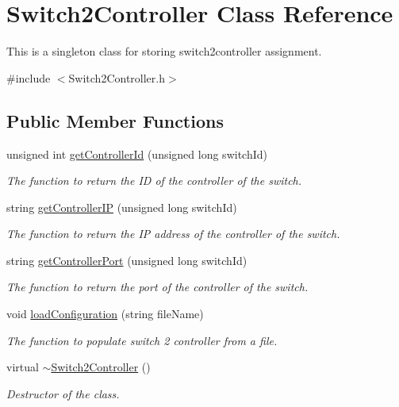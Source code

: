 \hypertarget{classSwitch2Controller}{\section{\-Switch2\-Controller \-Class \-Reference}
\label{classSwitch2Controller}
}


\-This is a singleton class for storing switch2controller assignment.  




{\ttfamily \#include $<$\-Switch2\-Controller.\-h$>$}

\subsection*{\-Public \-Member \-Functions}
\begin{DoxyCompactItemize}
\item 
unsigned int \hyperlink{classSwitch2Controller_aa7684e42768e3f4fa4ddd6f98c52057e}{get\-Controller\-Id} (unsigned long switch\-Id)
\begin{DoxyCompactList}\small\item\em \-The function to return the \-I\-D of the controller of the switch. \end{DoxyCompactList}\item 
string \hyperlink{classSwitch2Controller_a6b13d6b48d28cd1358f74742099dcf17}{get\-Controller\-I\-P} (unsigned long switch\-Id)
\begin{DoxyCompactList}\small\item\em \-The function to return the \-I\-P address of the controller of the switch. \end{DoxyCompactList}\item 
string \hyperlink{classSwitch2Controller_a90ce6d47bb11dfd94f8490952960ec90}{get\-Controller\-Port} (unsigned long switch\-Id)
\begin{DoxyCompactList}\small\item\em \-The function to return the port of the controller of the switch. \end{DoxyCompactList}\item 
void \hyperlink{classSwitch2Controller_a6253e0813a58602a746e60327447a3ff}{load\-Configuration} (string file\-Name)
\begin{DoxyCompactList}\small\item\em \-The function to populate switch 2 controller from a file. \end{DoxyCompactList}\item 
\hypertarget{classSwitch2Controller_ae4815992f72876f487105337a64c1418}{virtual \hyperlink{classSwitch2Controller_ae4815992f72876f487105337a64c1418}{$\sim$\-Switch2\-Controller} ()}\label{classSwitch2Controller_ae4815992f72876f487105337a64c1418}

\begin{DoxyCompactList}\small\item\em \-Destructor of the class. \end{DoxyCompactList}\end{DoxyCompactItemize}
